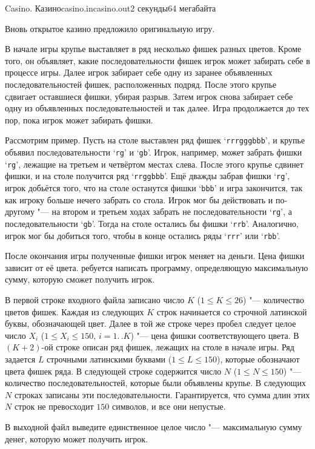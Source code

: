 \begin{problem}{Casino. Казино}{casino.in}{casino.out}{2 секунды}{64 мегабайта}

Вновь открытое казино предложило оригинальную игру. 

В начале игры крупье выставляет в ряд несколько фишек разных цветов. Кроме того, он объявляет, какие
последовательности фишек игрок может забирать себе в процессе игры. Далее игрок забирает себе одну
из заранее объявленных последовательностей фишек, расположенных подряд. После этого крупье сдвигает
оставшиеся фишки, убирая разрыв. Затем игрок снова забирает себе одну из объявленных
последовательностей и так далее. Игра продолжается до тех пор, пока игрок может забирать фишки.

Рассмотрим пример. Пусть на столе выставлен ряд фишек `\texttt{rrrgggbbb}', и крупье объявил последовательности
`\texttt{rg}' и `\texttt{gb}'. Игрок, например, может забрать фишки `\texttt{rg}', лежащие на третьем и четвёртом местах слева. После
этого крупье сдвинет фишки, и на столе получится ряд `\texttt{rrggbbb}'. Ещё дважды забрав фишки `\texttt{rg}', игрок
добьётся того, что на столе останутся фишки `\texttt{bbb}' и игра закончится, так как игроку больше нечего
забрать со стола. Игрок мог бы действовать и по-другому "--- на втором и третьем ходах забрать не
последовательности `\texttt{rg}', а последовательности `\texttt{gb}'. Тогда на столе остались бы фишки `\texttt{rrb}'. Аналогично,
игрок мог бы добиться того, чтобы в конце остались ряды `\texttt{rrr}' или `\texttt{rbb}'.

После окончания игры полученные фишки игрок меняет на деньги. Цена фишки зависит от её цвета. 
ребуется написать программу, определяющую максимальную сумму, которую сможет получить игрок.


\InputFile

В первой строке входного файла записано число $K$ ($1 \leq K \leq 26$) "--- количество цветов фишек. Каждая из
следующих $K$ строк начинается со строчной латинской буквы, обозначающей цвет. Далее в той же строке
через пробел следует целое число $X_i$ ($1 \leq X_i \leq 150$, $i = 1.\,.K$) "--- цена фишки соответствующего цвета.
В $(K+2)$-ой строке описан ряд фишек, лежащих на столе в начале игры. Ряд задается $L$ строчными
латинскими буквами ($1 \leq L \leq 150$), которые обозначают цвета фишек ряда.
В следующей строке содержится число $N$ ($1 \leq N \leq 150$) "--- количество последовательностей, которые были
объявлены крупье. В следующих $N$ строках записаны эти последовательности. Гарантируется, что сумма
длин этих $N$ строк не превосходит $150$ символов, и все они непустые.

\OutputFile
В выходной файл выведите единственное целое число "--- максимальную сумму денег, которую может 
получить игрок.

\Example

{\small{
\begin{example}
%
\end{example}
}}

\end{problem}
